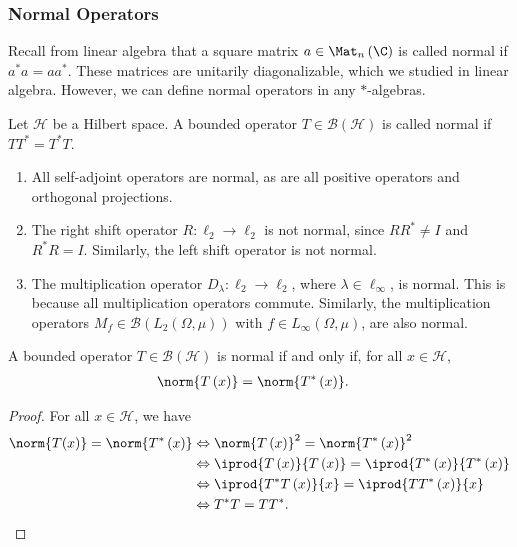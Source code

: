 \documentclass[10pt]{mypackage}
\begin{document}
\subsubsection{Normal Operators}%
Recall from linear algebra that a square matrix $a\in \Mat_{n}\left(\C\right)$ is called normal if $a^{\ast}a = aa^{\ast}$. These matrices are unitarily diagonalizable, which we studied in linear algebra. However, we can define normal operators in any $\ast$-algebras.
\begin{definition}
  Let $\mathcal{H}$ be a Hilbert space. A bounded operator $T\in \mathcal{B}\left(\mathcal{H}\right)$ is called normal if $TT^{\ast} = T^{\ast}T$.
\end{definition}
\begin{example}\hfill
  \begin{enumerate}[(1)]
    \item All self-adjoint operators are normal, as are all positive operators and orthogonal projections.
    \item The right shift operator $R: \ell_2\rightarrow \ell_2$ is not normal, since $RR^{\ast} \neq I$ and $R^{\ast}R = I$. Similarly, the left shift operator is not normal.
    \item The multiplication operator $D_{\lambda}:\ell_2\rightarrow \ell_2$, where $\lambda \in \ell_{\infty}$, is normal. This is because all multiplication operators commute. Similarly, the multiplication operators $M_{f}\in \mathcal{B}\left(L_{2}\left(\Omega,\mu\right)\right)$ with $f\in L_{\infty}\left(\Omega,\mu\right)$, are also normal.
  \end{enumerate}
\end{example}
\begin{lemma}
  A bounded operator $T\in \mathcal{B}\left(\mathcal{H}\right)$ is normal if and only if, for all $x\in \mathcal{H}$,
  \begin{align*}
    \norm{T\left(x\right)} &= \norm{T^{\ast}\left(x\right)}.
  \end{align*}
\end{lemma}
\begin{proof}
  For all $x\in \mathcal{H}$, we have
  \begin{align*}
    \norm{T(x)} = \norm{T^{\ast}\left(x\right)} &\Leftrightarrow \norm{T\left(x\right)}^2 = \norm{T^{\ast}\left(x\right)}^2\\
                                                &\Leftrightarrow \iprod{T\left(x\right)}{T\left(x\right)} = \iprod{T^{\ast}\left(x\right)}{T^{\ast}\left(x\right)}\\
                                                &\Leftrightarrow \iprod{T^{\ast}T\left(x\right)}{x} = \iprod{TT^{\ast}\left(x\right)}{x}\\
                                                &\Leftrightarrow T^{\ast}T = TT^{\ast}.
  \end{align*}
\end{proof}
\end{document}
